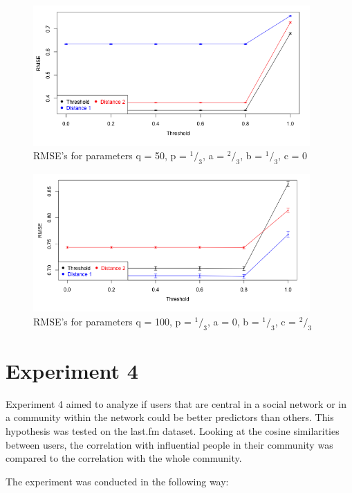 \begin{figure}[!h]
\includegraphics[width=400px]{./4-experiments/figures/Result2_50_066_033_033.png}
\caption{RMSE's for parameters q = 50, p = $^1 / _3$, a = $^2 / _3$, b = $^1 / _3$, c = 0}
\label{f:result01}
\end{figure}

\begin{figure}[!h]
\includegraphics[width=400px]{./4-experiments/figures/Result2_100_00_033_033.png}
\caption{RMSE's for parameters q = 100, p = $^1 / _3$, a = 0, b = $^1 / _3$, c = $^2 / _3$}
\label{f:result02}
\end{figure}
\section{Experiment 4}
\label{st:experiment4} Experiment 4 aimed to analyze if users that are central in a social network or in a community within the network could be better predictors than others. This hypothesis was tested on the last.fm dataset. Looking at the cosine similarities between users, the correlation with influential people in their community was compared to the correlation with the whole community.
\newline

The experiment was conducted in the following way:

